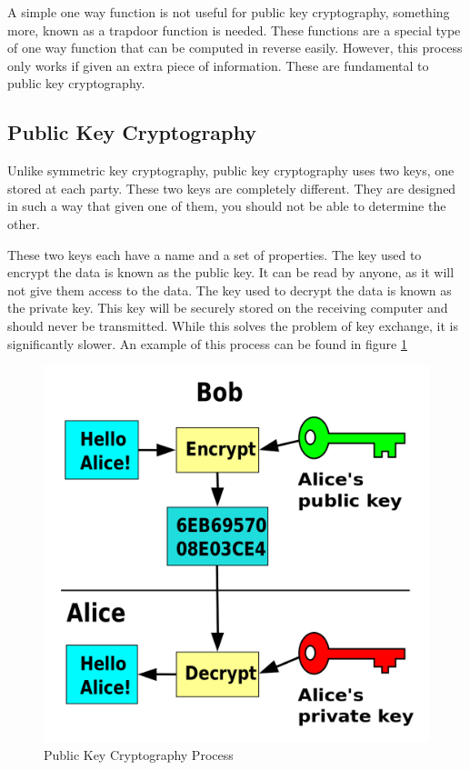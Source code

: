 				A simple one way function is not useful for public key cryptography,
				something more, known as a trapdoor function is needed.
				These functions are a special type of one way function that can be computed in reverse easily.
				However, this process only works if given an extra piece of information.
				These are fundamental to public key cryptography.

			\subsection{Public Key Cryptography}
				Unlike symmetric key cryptography, public key cryptography uses two keys, one stored at each party.
				These two keys are completely different.
				They are designed in such a way that given one of them, you should not be able to determine the other.

				These two keys each have a name and a set of properties.
				The key used to encrypt the data is known as the public key.
				It can be read by anyone, as it will not give them access to the data.
				The key used to decrypt the data is known as the private key.
				This key will be securely stored on the receiving computer and should never be transmitted.
				While this solves the problem of key exchange, it is significantly slower.
				An example of this process can be found in figure \ref{fig:PublicKey}
				\begin{figure}[htb]
					\centering
					\includegraphics[scale=0.25]{./PublicKey.png}
					\caption{Public Key Cryptography Process}
					\label{fig:PublicKey}
				\end{figure}

